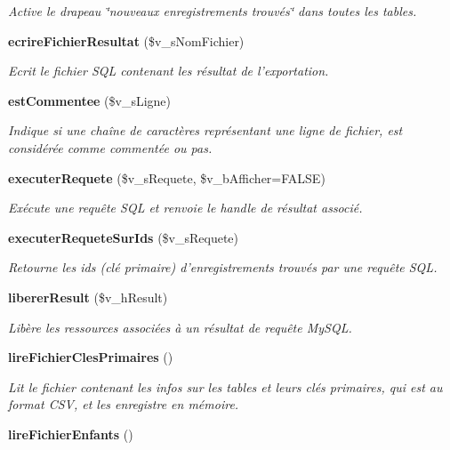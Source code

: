 \begin{CompactItemize}
\begin{CompactList}\small\item\em Active le drapeau \char`\"{}nouveaux enregistrements trouvés\char`\"{} dans toutes les tables. \item\end{CompactList}\item 
{\bf ecrireFichierResultat} (\$v\_\-sNomFichier)
\begin{CompactList}\small\item\em Ecrit le fichier SQL contenant les résultat de l'exportation. \item\end{CompactList}\item 
{\bf estCommentee} (\$v\_\-sLigne)
\begin{CompactList}\small\item\em Indique si une chaîne de caractères représentant une ligne de fichier, est considérée comme commentée ou pas. \item\end{CompactList}\item 
{\bf executerRequete} (\$v\_\-sRequete, \$v\_\-bAfficher=FALSE)
\begin{CompactList}\small\item\em Exécute une requête SQL et renvoie le handle de résultat associé. \item\end{CompactList}\item 
{\bf executerRequeteSurIds} (\$v\_\-sRequete)
\begin{CompactList}\small\item\em Retourne les ids (clé primaire) d'enregistrements trouvés par une requête SQL. \item\end{CompactList}\item 
{\bf libererResult} (\$v\_\-hResult)
\begin{CompactList}\small\item\em Libère les ressources associées à un résultat de requête MySQL. \item\end{CompactList}\item 
{\bf lireFichierClesPrimaires} ()\label{class_c_export_db_5b87ec1e8b408fcd8b2299b8b4e33cd1}

\begin{CompactList}\small\item\em Lit le fichier contenant les infos sur les tables et leurs clés primaires, qui est au format CSV, et les enregistre en mémoire. \item\end{CompactList}\item 
{\bf lireFichierEnfants} ()\label{class_c_export_db_fa462d2cc85d116a8e282f3828632c81}


\end{CompactItemize}
